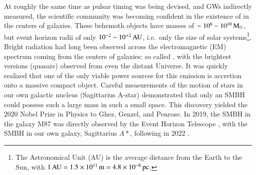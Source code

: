\documentclass[onecolumn,authoryear]{els-mrw}
\begin{document}
At roughly the same time as pulsar timing was being devised, and GWs indirectly measured, the scientific community was becoming confident in the existence of  in the centers of galaxies.  These behemoth objects have masses of $\sim 10^6 - 10^{10} \, \textrm{M}_{\odot}$, but event horizon radii of only $10^{-2} - 10^{+2} \, \textrm{AU}$, i.e.~only the size of solar systems\footnote{The Astronomical Unit (AU) is the average distance from the Earth to the Sun, with $1 \, \textrm{AU} = 1.5\times\nobreak10^{11} \, \textrm{m} = 4.8\times\nobreak10^{-6} \, \mathrm{pc}$.}.  Bright radiation had long been observed across the electromagnetic (EM) spectrum coming from the centers of galaxies: so called , with the brightest versions (quasars) observed from even the distant Universe.  It was quickly realized that one of the only viable power sources for this emission is accretion onto a massive compact object.
Careful measurements of the motion of stars in our own galactic nucleus (Sagittarius A-star) demonstrated that only an SMBH could possess such a large mass in such a small space.  This discovery yielded the 2020 Nobel Prize in Physics to Ghez, Genzel, and Penrose.  In 2019, the SMBH in the galaxy M87 was directly observed by the Event Horizon Telescope \citep{EHT-2019}, with the SMBH in our own galaxy, Sagittarius $A*$, following in 2022 \citep{EHT-2022}.
\end{document}
